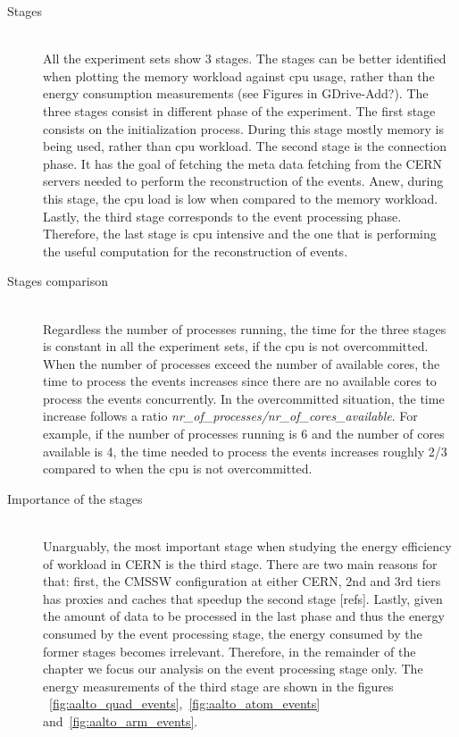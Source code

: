 \begin{description}
\item[Stages] \hfill \\
All the experiment sets show 3 stages. The stages can be better identified 
when plotting
the memory workload against cpu usage, rather than the energy consumption 
measurements (see Figures in GDrive-Add?). The three stages consist in different 
phase of the
experiment. The first stage consists on the initialization process. During this
stage mostly memory is being used, rather than cpu workload. The second stage
is the connection phase. It has the goal of fetching the  meta data fetching from
the CERN servers needed to perform the reconstruction of the events. Anew, 
during this stage, the cpu load is low when compared to the 
memory workload. Lastly, the third stage corresponds to the event processing
phase. Therefore, the last stage is cpu intensive and the one that is performing 
the useful computation for the reconstruction of events.

\item[Stages comparison] \hfill \\
Regardless the number of processes running, the time for the three stages is 
constant in all the experiment sets, if the cpu is not overcommitted. When
the number of processes exceed the number of available cores, the time to 
process the events increases since there are no available cores to process the
events concurrently. In the overcommitted situation, the time increase follows
a ratio \textit{nr\_of\_processes/nr\_of\_cores\_available}. For example, if the
number of processes running is 6 and the number of cores available is 4, the
time needed to process the events increases roughly 2/3 compared to when the
cpu is not overcommitted.   


\item[Importance of the stages] \hfill \\
Unarguably, the most important stage when studying the energy efficiency of
workload in CERN is the third stage. There are two main reasons for that: first,
 the CMSSW configuration at either CERN, 2nd and 3rd tiers has proxies
and caches that speedup the second stage [refs]. Lastly, given the amount of
data to be processed in the last phase and thus the energy consumed by the
event processing stage, the energy consumed by the former stages becomes
 irrelevant. Therefore, in the remainder of the chapter we focus our analysis on 
 the event processing stage only. The energy measurements of the third stage are
shown in the figures
~\ref{fig:aalto_quad_events},~\ref{fig:aalto_atom_events} and~\ref{fig:aalto_arm_events}. 




\end{description}


